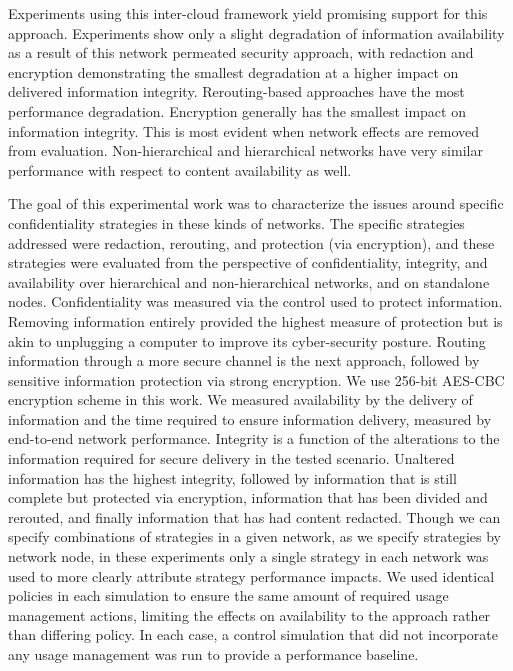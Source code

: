 Experiments using this inter-cloud framework yield promising support for this approach.  Experiments show only a slight degradation of information availability as a result of this network permeated security approach, with redaction and encryption demonstrating the smallest degradation at a higher impact on delivered information integrity.  Rerouting-based approaches have the most performance degradation. Encryption generally has the smallest impact on information integrity.  This is most evident when network effects are removed from evaluation.  Non-hierarchical and hierarchical networks have very similar performance with respect to content availability as well.

The goal of this experimental work was to characterize the issues around specific confidentiality strategies in these kinds of networks.  The specific strategies addressed were redaction, rerouting, and protection (via encryption), and these strategies were evaluated from the perspective of confidentiality, integrity, and availability over hierarchical and non-hierarchical networks, and on standalone nodes. Confidentiality was measured via the control used to protect information.  Removing information entirely provided the highest measure of protection but is akin to unplugging a computer to improve its cyber-security posture.   Routing information through a more secure channel is the next approach, followed by sensitive information protection via strong encryption.  We use 256-bit AES-CBC encryption scheme in this work.  We measured availability by the delivery of information and the time required to ensure information delivery, measured by end-to-end network performance.  Integrity is a function of the alterations to the information required for secure delivery in the tested scenario.  Unaltered information has the highest integrity, followed by information that is still complete but protected via encryption, information that has been divided and rerouted, and finally information that has had content redacted.  Though we can specify combinations of strategies in a given network, as we specify strategies by network node, in these experiments only a single strategy in each network was used to more clearly attribute strategy performance impacts. We used identical policies in each simulation to ensure the same amount of required usage management actions, limiting the effects on availability to the approach rather than differing policy.  In each case, a control simulation that did not incorporate any usage management was run to provide a performance baseline.  

